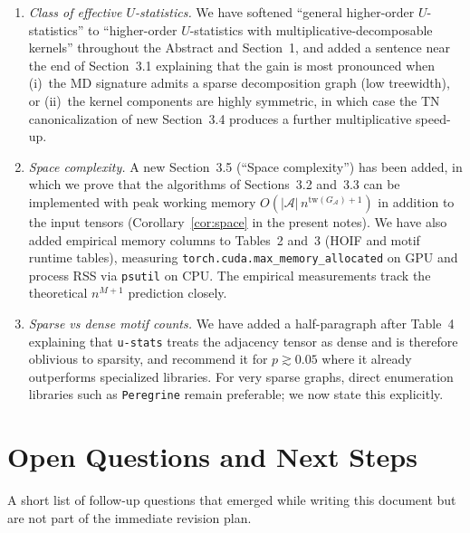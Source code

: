 \documentclass[11pt]{article}
\newcommand{\calA}{\mathcal{A}}
\newcommand{\tw}{\mathrm{tw}}
\newcommand{\package}{\texttt{u-stats}}
\newcommand{\peregrine}{\texttt{Peregrine}}
\theoremstyle{plain}
\theoremstyle{definition}
\begin{document}
\begin{enumerate}[leftmargin=2.4em,label=\textbf{(\arabic*)}]
\item \emph{Class of effective $U$-statistics.}
We have softened ``general higher-order $U$-statistics'' to
``higher-order $U$-statistics with multiplicative-decomposable kernels''
throughout the Abstract and Section~1, and added a sentence near the
end of Section~3.1 explaining that the gain is most pronounced when
(i)~the MD signature admits a sparse decomposition graph (low
treewidth), or (ii)~the kernel components are highly symmetric, in
which case the TN canonicalization of new Section~3.4 produces a
further multiplicative speed-up.

\item \emph{Space complexity.}
A new Section~3.5 (``Space complexity'') has been added, in which we
prove that the algorithms of Sections~3.2 and~3.3 can be implemented
with peak working memory $O(|\calA|\,n^{\tw(G_\calA)+1})$ in addition
to the input tensors (Corollary~\ref{cor:space} in the present notes).
We have also added empirical memory columns to Tables~2 and~3 (HOIF and
motif runtime tables), measuring
\texttt{torch.cuda.max\_memory\_allocated} on GPU and process RSS
via \texttt{psutil} on CPU.  The empirical measurements track the
theoretical $n^{M+1}$ prediction closely.

\item \emph{Sparse vs dense motif counts.}
We have added a half-paragraph after Table~4 explaining that
\package{} treats the adjacency tensor as dense and is therefore
oblivious to sparsity, and recommend it for $p\gtrsim 0.05$ where it
already outperforms specialized libraries.  For very sparse graphs,
direct enumeration libraries such as \peregrine{} remain preferable;
we now state this explicitly.
\end{enumerate}

\section{Open Questions and Next Steps}
\label{sec:next}

A short list of follow-up questions that emerged while writing this document
but are not part of the immediate revision plan.
\end{document}
